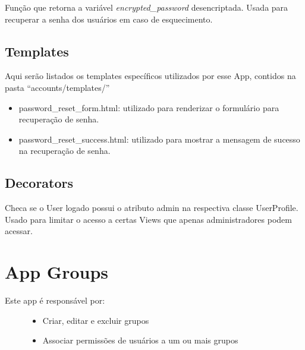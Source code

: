 \documentclass[letterpaper,10pt,brazil]{sphinxmanual}
\begin{document}
\begin{fulllineitems}
\label{apps/accounts:accounts.views.unencrypt}
Função que retorna a variável \emph{encrypted\_password} desencriptada. Usada para recuperar a senha dos usuários em caso de esquecimento.

\end{fulllineitems}



\subsection{Templates}
\label{apps/accounts:templates}
Aqui serão listados os templates específicos utilizados por esse App, contidos na pasta ``accounts/templates/''
\begin{itemize}
\item {} 
password\_reset\_form.html: utilizado para renderizar o formulário para recuperação de senha.

\item {} 
password\_reset\_success.html: utilizado para mostrar a mensagem de sucesso na recuperação de senha.

\end{itemize}


\subsection{Decorators}
\label{apps/accounts:module-accounts.decorators}\label{apps/accounts:decorators}

\begin{fulllineitems}
\label{apps/accounts:accounts.decorators.is_admin}
Checa se o User logado possui o atributo admin na respectiva classe UserProfile. Usado para limitar o acesso a certas Views que apenas administradores podem acessar.

\end{fulllineitems}



\section{App Groups}
\label{apps/groups:app-groups}\label{apps/groups::doc}\label{apps/groups:groups}\begin{description}
\item[{Este app é responsável por:}] \leavevmode\begin{itemize}
\item {} 
Criar, editar e excluir grupos

\item {} 
Associar permissões de usuários a um ou mais grupos

\end{itemize}

\end{description}
\end{document}

